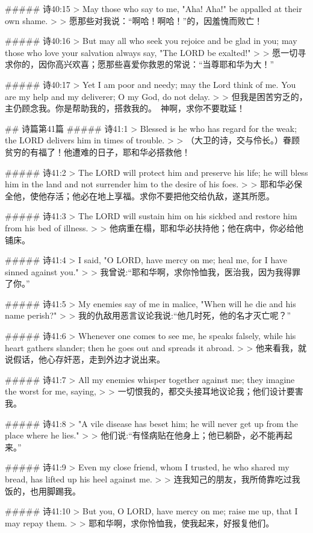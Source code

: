 ##### 诗40:15
> May those who say to me, "Aha! Aha!" be appalled at their own shame.
>
> 愿那些对我说：“啊哈！啊哈！”的，因羞愧而败亡！


##### 诗40:16
> But may all who seek you rejoice and be glad in you; may those who love your salvation always say, "The LORD be exalted!"
>
> 愿一切寻求你的，因你高兴欢喜；愿那些喜爱你救恩的常说：“当尊耶和华为大！”


##### 诗40:17
> Yet I am poor and needy; may the Lord think of me. You are my help and my deliverer; O my God, do not delay.
>
> 但我是困苦穷乏的，主仍顾念我。你是帮助我的，搭救我的。　神啊，求你不要耽延！


## 诗篇第41篇
##### 诗41:1
> Blessed is he who has regard for the weak; the LORD delivers him in times of trouble.
>
> （大卫的诗，交与伶长。）眷顾贫穷的有福了！他遭难的日子，耶和华必搭救他！


##### 诗41:2
> The LORD will protect him and preserve his life; he will bless him in the land and not surrender him to the desire of his foes.
>
> 耶和华必保全他，使他存活；他必在地上享福。求你不要把他交给仇敌，遂其所愿。


##### 诗41:3
> The LORD will sustain him on his sickbed and restore him from his bed of illness.
>
> 他病重在榻，耶和华必扶持他；他在病中，你必给他铺床。


##### 诗41:4
> I said, "O LORD, have mercy on me; heal me, for I have sinned against you."
>
> 我曾说:“耶和华啊，求你怜恤我，医治我，因为我得罪了你。”


##### 诗41:5
> My enemies say of me in malice, "When will he die and his name perish?"
>
> 我的仇敌用恶言议论我说:“他几时死，他的名才灭亡呢？”


##### 诗41:6
> Whenever one comes to see me, he speaks falsely, while his heart gathers slander; then he goes out and spreads it abroad.
>
> 他来看我，就说假话，他心存奸恶，走到外边才说出来。


##### 诗41:7
> All my enemies whisper together against me; they imagine the worst for me, saying,
>
> 一切恨我的，都交头接耳地议论我；他们设计要害我。


##### 诗41:8
> "A vile disease has beset him; he will never get up from the place where he lies."
>
> 他们说:“有怪病贴在他身上；他已躺卧，必不能再起来。”


##### 诗41:9
> Even my close friend, whom I trusted, he who shared my bread, has lifted up his heel against me.
>
> 连我知己的朋友，我所倚靠吃过我饭的，也用脚踢我。


##### 诗41:10
> But you, O LORD, have mercy on me; raise me up, that I may repay them.
>
> 耶和华啊，求你怜恤我，使我起来，好报复他们。


